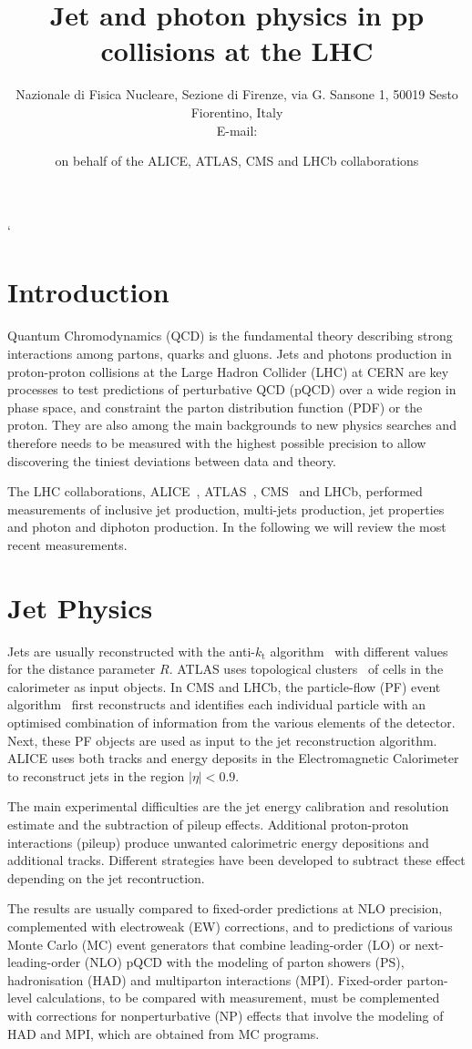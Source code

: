 \documentclass{PoS}
\title{Jet and photon physics in pp collisions at the LHC}
\author{\speaker{ Vitaliano Ciulli }%
Nazionale di Fisica Nucleare, Sezione di Firenze, via G. Sansone 1, 50019 Sesto Fiorentino, Italy \\ E-mail:
\email{vitaliano.ciulli@fi.infn.it}} \author{on behalf of the ALICE, ATLAS, CMS and LHCb collaborations}
\providecommand{\kts}{\ensuremath{k_{\mathrm{t}}}\xspace}
\begin{document}
`
\section{Introduction}

Quantum Chromodynamics (QCD) is the fundamental theory describing strong interactions among partons, \ie quarks and
gluons. Jets and photons production in proton-proton collisions at the Large Hadron Collider (LHC) at CERN are key processes to test predictions of
perturbative QCD (pQCD) over a wide region in phase space, and constraint the parton distribution function (PDF) or the
proton. They are also among the main backgrounds to new physics searches and therefore needs to be measured with the
highest possible precision to allow discovering the tiniest deviations between data and theory.

The LHC collaborations, ALICE~, ATLAS~\cite{Aad:2008zzm}, CMS~\cite{Chatrchyan:2008aa} and LHCb, performed
measurements of inclusive jet production, multi-jets production, jet properties and photon and diphoton production. 
In the following we will review the most recent measurements.

\section{Jet Physics}

Jets are usually reconstructed with the anti-\kts algorithm~\cite{Cacciari:2008gp} with different values for the distance parameter $R$.
ATLAS uses topological clusters~\cite{Lampl:2008zz} of cells in the calorimeter as input objects. 
In CMS and LHCb, the particle-flow (PF) event algorithm~\cite{CMS:2009nxa}
first reconstructs and identifies each individual particle with an optimised
combination of information from the various elements of the detector. Next, these PF objects are used as input to the jet
reconstruction algorithm. ALICE uses both tracks and energy deposits in the
Electromagnetic Calorimeter to reconstruct jets in the region $|\eta|<0.9$.

The main experimental difficulties are the jet energy calibration and resolution estimate and the subtraction of pileup
effects. Additional proton-proton interactions (pileup) produce unwanted calorimetric energy depositions and additional
tracks. Different strategies have been developed to subtract these effect depending on the jet recontruction.

The results are usually compared to fixed-order predictions at NLO precision, complemented with electroweak (EW) corrections, and to predictions of
various Monte Carlo (MC) event generators that combine leading-order (LO) or next-leading-order (NLO) pQCD with the modeling of parton
showers (PS), hadronisation (HAD) and multiparton interactions (MPI).
Fixed-order parton-level calculations, to be compared with measurement, must be complemented with corrections for nonperturbative
(NP) effects that involve the modeling of HAD and MPI, which are obtained from MC programs. 
\end{document}
